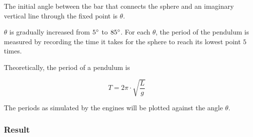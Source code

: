 \documentclass[12pt,a4paper,twoside,openright]{report}
\begin{document}
The initial angle between the bar that connects the sphere and an imaginary vertical line through the fixed point is $\theta$.

\begin{center}
\end{center}

$\theta$ is gradually increased from $5 \degree$ to $85 \degree$.
For each $\theta$, 
the period of the pendulum is measured by recording the time it takes for the sphere to reach its lowest point $5$ times.

Theoretically, the period of a pendulum is

\begin{equation}
T = 2  \pi \cdot \sqrt{\frac{L}{g}}
\end{equation}

The periods as simulated by the engines will be plotted against the angle $\theta$.

\subsubsection{Result}

\begin{figure} 
    \captionsetup{labelsep=none}
    \begin{center}
      \end{center}
      \caption{}
      \label{ev4}
    \end{figure}
\end{document}
